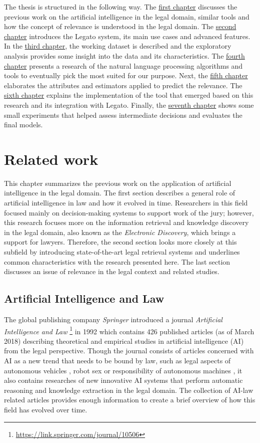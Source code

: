 \documentclass[
  digital, %
  notable,   %
  nolof,     %
  nolot,     %
]{fithesis3}
\begin{document}
The thesis is structured in the following way.
The \hyperref[chp:related_work]{first chapter} discusses the previous work on the artificial intelligence in the legal domain, similar tools and how the concept of relevance is understood in the legal domain.
The \hyperref[chp:legato]{second chapter} introduces the Legato system, its main use cases and advanced features.
In the \hyperref[chp:data_characteristics]{third chapter}, the working dataset is described and the exploratory analysis provides some insight into the data and its characteristics.
The \hyperref[chp:nlp]{fourth chapter} presents a research of the natural language processing algorithms and tools to eventually pick the most suited for our purpose.
Next, the \hyperref[chp:classification]{fifth chapter} elaborates the attributes and estimators applied to predict the relevance.
The \hyperref[chp:implementation]{sixth chapter} explains the implementation of the tool that emerged based on this research and its integration with Legato.
Finally, the \hyperref[chp:evaluation]{seventh chapter} shows some small experiments that helped assess intermediate decisions and evaluates the final models.

\chapter{Related work}
\label{chp:related_work}
This chapter summarizes the previous work on the application of artificial intelligence in the legal domain. 
The first section describes a general role of artificial intelligence in law and how it evolved in time.
Researchers in this field focused mainly on decision-making systems to support work of the jury; however, this research focuses more on the information retrieval and knowledge discovery in the legal domain, also known as the \textit{Electronic Discovery}, which brings a support for lawyers.
Therefore, the second section looks more closely at this subfield by introducing state-of-the-art legal retrieval systems and underlines common characteristics with the research presented here.
The last section discusses an issue of relevance in the legal context and related studies.

\section{Artificial Intelligence and Law}
The global publishing company \textit{Springer} introduced a journal \textit{Artificial Intelligence and Law} \footnote{\url{https://link.springer.com/journal/10506}} in 1992 which contains 426 published articles (as of March 2018) describing theoretical and empirical studies in artificial intelligence (AI) from the legal perspective.
Though the journal consists of articles concerned with AI as a new trend that needs to be bound by law, such as legal aspects of autonomous vehicles \cite{Prakken2017autonomous}, robot sex \cite{Frank2017robotSex} or responsibility of autonomous machines \cite{Brozek2017AIresponsibility}, it also contains researches of new innovative AI systems that perform automatic reasoning and knowledge extraction in the legal domain.
The collection of AI-law related articles provides enough information to create a brief overview of how this field has evolved over time.
\end{document}

